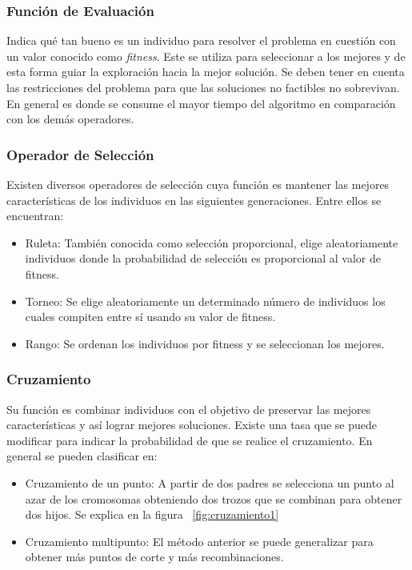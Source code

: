 \subsubsection{Función de Evaluación} 
Indica qué tan bueno es un individuo para resolver el problema en cuestión con un valor conocido como \emph{fitness}. Este se utiliza para seleccionar a los mejores y de esta forma guiar la exploración hacia la mejor solución.
Se deben tener en cuenta las restricciones del problema para que las soluciones no factibles no sobrevivan.
En general es donde se consume el mayor tiempo del algoritmo en comparación con los demás operadores.

\subsubsection{Operador de Selección}
Existen diversos operadores de selección cuya función es mantener las mejores características de los individuos en las siguientes generaciones. Entre ellos se encuentran:
\begin{itemize}
	\item Ruleta: También conocida como selección proporcional, elige aleatoriamente individuos donde la probabilidad de selección es proporcional al valor de fitness.
	\item Torneo: Se elige aleatoriamente un determinado número de individuos los cuales compiten entre sí usando su valor de fitness.
	\item Rango: Se ordenan los individuos por fitness y se seleccionan los mejores.
\end{itemize}

\subsubsection{Cruzamiento}
Su función es combinar individuos con el objetivo de preservar las mejores características y así lograr mejores soluciones. 
Existe una tasa que se puede modificar para indicar la probabilidad de que se realice el cruzamiento. En general se pueden clasificar en:

\begin{itemize}
	\item Cruzamiento de un punto: A partir de dos padres se selecciona un punto al azar de los cromosomas obteniendo dos trozos que se combinan para obtener dos hijos. Se explica en la figura ~\ref{fig:cruzamiento1}
	\item Cruzamiento multipunto: El método anterior se puede generalizar para obtener más puntos de corte y más recombinaciones.
\end{itemize}

